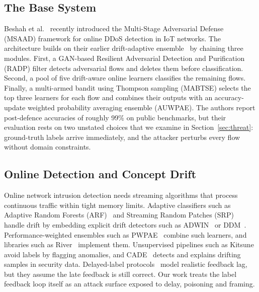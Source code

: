 \documentclass[conference]{IEEEtran}
\begin{document}
\subsection{The Base System}
Beshah et al.~\cite{beshah2025msaad} recently introduced the Multi-Stage
Adversarial Defense (MSAAD) framework for online DDoS detection in IoT
networks. The architecture builds on their earlier drift-adaptive
ensemble~\cite{beshah2024drift} by chaining three modules. First, a GAN-based
Resilient Adversarial Detection and Purification (RADP) filter detects
adversarial flows and deletes them before classification. Second, a pool of
five drift-aware online learners classifies the remaining flows. Finally, a
multi-armed bandit using Thompson sampling (MABTSE) selects the top three
learners for each flow and combines their outputs with an accuracy-update weighted probability
averaging ensemble (AUWPAE). The authors report post-defence accuracies of roughly 99\%
on public benchmarks, but their evaluation rests on two unstated choices that we
examine in Section~\ref{sec:threat}: ground-truth labels arrive immediately, and
the attacker perturbs every flow without domain constraints.

\subsection{Online Detection and Concept Drift}
Online network intrusion detection needs streaming algorithms that process
continuous traffic within tight memory limits. Adaptive classifiers such as
Adaptive Random Forests (ARF)~\cite{gomes2017arf} and Streaming Random Patches
(SRP)~\cite{gomes2019srp} handle drift by embedding explicit drift detectors
such as ADWIN~\cite{bifet2007adwin} or DDM~\cite{gama2004ddm}.
Performance-weighted ensembles such as PWPAE~\cite{yang2021pwpae} combine such
learners, and libraries such as River~\cite{montiel2021river} implement them.
Unsupervised pipelines such as Kitsune~\cite{mirsky2018kitsune} avoid labels by
flagging anomalies, and CADE~\cite{yang2021cade} detects and explains drifting
samples in security data. Delayed-label
protocols~\cite{grzenda2020delayed,ceschin2024stream} model realistic feedback
lag, but they assume the late feedback is still correct. Our work treats the
label feedback loop itself as an attack surface exposed to delay, poisoning and
framing.
\end{document}
